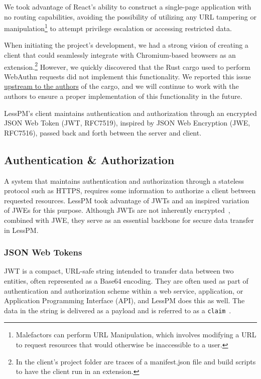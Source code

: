 We took advantage of React's ability to construct a single-page application with
no routing capabilities, avoiding the possibility of utilizing any URL tampering
or manipulation\footnote{
  Malefactors can perform URL Manipulation, which involves modifying a URL to
  request resources that would otherwise be inaccessible to a user.
} to attempt privilege escalation or
accessing restricted data.

When initiating the project's development, we had a strong vision of creating
a client that could seamlessly integrate with Chromium-based browsers as
an extension.\footnote{
  In the client's project folder are traces of a manifest.json file and build
  scripts to have the client run in an extension.
}
However, we quickly discovered that the Rust cargo used to perform WebAuthn
requests did not implement this functionality.
We reported this issue
\href{https://github.com/kanidm/webauthn-rs/issues/288}{upstream to the authors}
of the cargo, and we will continue to work with the authors to ensure a proper
implementation of this functionality in the future.

LessPM's client maintains authentication and authorization through an
encrypted JSON Web Token (JWT, RFC7519), inspired by JSON Web
Encryption (JWE, RFC7516), passed back and forth between the server and client.

\subsection{Authentication \& Authorization}\label{subsec:jwt}
A system that maintains authentication and authorization through a stateless
protocol such as HTTPS, requires some information to authorize a
client between requested resources.
LessPM took advantage of JWTs and an inspired variation of JWEs for this
purpose.
Although JWTs are not inherently encrypted~\cite{RFC7519}, combined with JWE,
they serve as an essential backbone for secure data transfer in LessPM\@.

\subsubsection{JSON Web Tokens}
JWT is a compact, URL-safe string intended to transfer data between two
entities, often represented as a Base64 encoding.
They are often used as part of authentication and authorization scheme within
a web service, application, or Application Programming Interface (API), and
LessPM does this as well.
The data in the string is delivered as a payload and is referred to as a
\texttt{claim}~\cite{RFC7519}.

